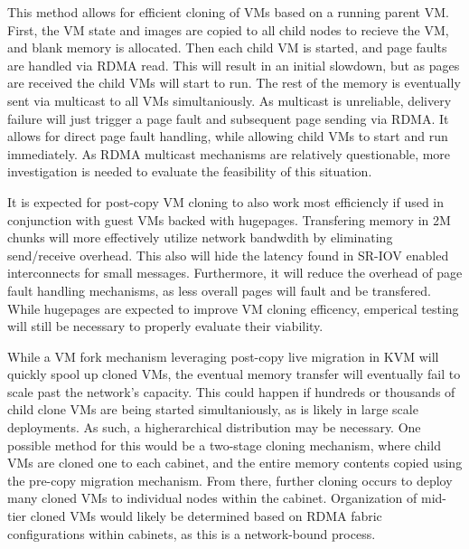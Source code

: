 This method allows for efficient cloning of VMs based on a running parent VM. First, the VM state and images are copied to all child nodes to recieve the VM, and blank memory is allocated. Then each child VM is started, and page faults are handled via RDMA read. This will result in an initial slowdown, but as pages are received the child VMs will start to run. The rest of the memory is eventually sent via multicast to all VMs simultaniously.   As multicast is unreliable, delivery failure will just trigger a page fault and subsequent page sending via RDMA.  It allows for direct page fault handling, while allowing child VMs to start and run immediately. As RDMA multicast mechanisms are relatively questionable,  more investigation is needed to evaluate the feasibility of this situation. %

It is expected for post-copy VM cloning to also work most efficiencly if used in conjunction with guest VMs backed with hugepages. Transfering memory in 2M chunks will more effectively utilize network bandwdith by eliminating send/receive overhead. This also will hide the latency found in SR-IOV enabled interconnects for small messages. Furthermore, it will reduce the overhead of page fault handling mechanisms, as less overall pages will fault and be transfered.  While hugepages are expected to improve VM cloning efficency, emperical testing will still be necessary to properly evaluate their viability.   

While a VM fork mechanism leveraging post-copy live migration in KVM will quickly spool up cloned VMs, the eventual memory transfer will eventually fail to scale past the network's capacity. This could happen if hundreds or thousands of child clone VMs are being started simultaniously, as is likely in large scale deployments. As such, a higherarchical distribution may be necessary. One possible method for this would be a two-stage cloning mechanism, where child VMs are cloned one to each cabinet, and the entire memory contents copied using the pre-copy migration mechanism. From there, further cloning occurs to deploy many cloned VMs to individual nodes within the cabinet. Organization of mid-tier cloned VMs would likely be determined based on RDMA fabric configurations within cabinets, as this is a network-bound process. 





